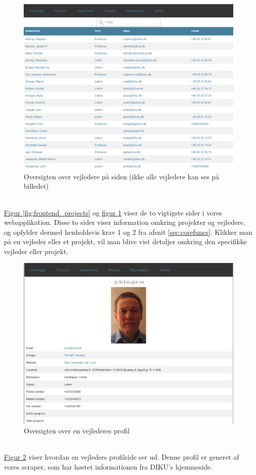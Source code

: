\documentclass[12pt]{article}
\begin{document}
\begin{figure}[H]
    \centering
    \includegraphics[scale=0.33]{frontend_supervisors.png}
    \caption{Oversigten over vejledere på siden (ikke alle vejledere kan ses på billedet)}
    \label{fig:frontend_supervisors}
\end{figure}
~\\
\hyperref[fig:frontend_projects]{Figur \ref*{fig:frontend_projects}} og \hyperref[fig:frontend_supervisors]{figur \ref*{fig:frontend_supervisors}} viser de to vigtigste sider i vores webapplikation. Disse to sider viser information omkring projekter og vejledere, og opfylder dermed henholdsvis krav 1 og 2 fra afsnit \ref{sec:corefuncs}. Klikker man på en vejleder eller et projekt, vil man blive vist detaljer omkring den specifikke vejleder eller projekt.

\begin{figure}[H]
    \centering
    \includegraphics[scale=0.33]{profile.png}
    \caption{Oversigten over en vejlederes profil}
    \label{fig:profile}
\end{figure}
~\\
\hyperref[fig:profile]{Figur \ref*{fig:profile}} viser hvordan en vejleders profilside ser ud. Denne profil er generet af vores scraper, som har høstet informationen fra DIKU's hjemmeside.
\end{document}
